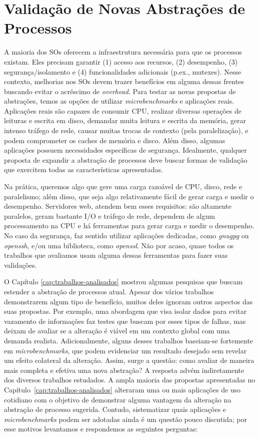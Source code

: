 \chapter{Validação de Novas Abstrações de Processos}
\label{cap:validacoes}

A maioria dos SOs oferecem a infraestrutura necessária para que os processos
existam. Eles precisam garantir (1) acesso aos recursos, (2) desempenho, (3)
segurança/isolamento e (4) funcionalidades adicionais (p.ex., mutexes).  Nesse
contexto, melhorias nos SOs devem trazer benefícios em alguma dessas frentes
buscando evitar o acréscimo de \emph{overhead}. Para testar as novas propostas de
abstrações, temos as opções de utilizar \emph{microbenchmarks} e aplicações
reais.  Aplicações reais são capazes de consumir CPU, realizar diversas
operações de leituras e escrita em disco, demandar muita leitura e escrita da
memória, gerar intenso tráfego de rede, causar muitas trocas de contexto (pela
paralelização), e podem comprometer os caches de memória e disco. Além disso,
algumas aplicações possuem necessidades específicas de segurança. Idealmente,
qualquer proposta de expandir a abstração de processos deve buscar formas de
validação que exercitem todas as características apresentadas.

Na prática, queremos algo que gere uma carga razoável de CPU, disco, rede e
paralelismo; além disso, que seja algo relativamente fácil de gerar carga e
medir o desempenho. Servidores web, atendem bem esses requisitos: são altamente
paralelos, geram bastante I/O e tráfego de rede, dependem de algum
processamento na CPU e há ferramentas para gerar carga e medir o desempenho. No
caso da segurança, faz sentido utilizar aplicações dedicadas, como
\emph{gnugpg} ou \emph{openssh}, e/ou uma biblioteca, como \emph{openssl}. Não
por acaso, quase todos os trabalhos que avaliamos usam alguma dessas
ferramentas para fazer suas validações.

O Capítulo \ref{cap:trabalhos-analisados} mostrou algumas pesquisas que buscam
estender a abstração de processos atual. Apesar dos vários trabalhos
demonstrarem algum tipo de benefício, muitos deles ignoram outros aspectos das
suas propostas. Por exemplo, uma abordagem que visa isolar dados para evitar
vazamento de informações faz testes que buscam por esses tipos de falhas, mas
deixam de avaliar se a alteração é viável em um contexto global com uma
demanda realista. Adicionalmente, alguns desses trabalhos baseiam-se
fortemente em \emph{microbenchmarks}, que podem evidenciar um resultado
desejado sem revelar um efeito colateral da alteração. Assim, surge a questão:
como avaliar de maneira mais completa e efetiva uma nova abstração? A resposta
advém indiretamente dos diversos trabalhos estudados. A ampla maioria das
propostas apresentadas no Capítulo~\ref{cap:trabalhos-analisados} alteraram uma
ou mais aplicações de uso cotidiano com o objetivo de demonstrar alguma
vantagem da alteração na abstração de processo sugerida. Contudo, sistematizar
quais aplicações e \emph{microbenchmarks} podem ser adotadas ainda é um questão
pouco discutida; por esse motivos levantamos e respondemos as seguintes
perguntas:

